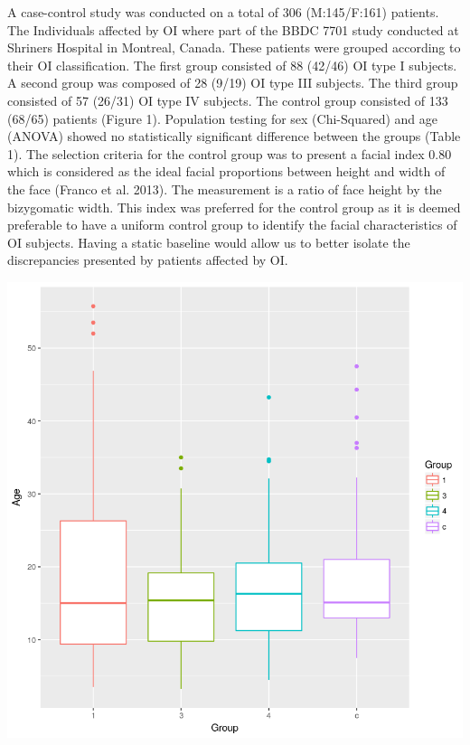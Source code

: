 \documentclass{article}
\begin{document}
\begin{multicols}{2}
A case-control study was conducted on a total of 306 (M:145/F:161)
patients. The Individuals affected by OI where part of the BBDC 7701
study conducted at Shriners Hospital in Montreal, Canada. These patients
were grouped according to their OI classification. The first group
consisted of 88 (42/46) OI type I subjects. A second group was composed
of 28 (9/19) OI type III subjects. The third group consisted of 57
(26/31) OI type IV subjects. The control group consisted of 133 (68/65)
patients (Figure 1). Population testing for sex (Chi-Squared) and age
(ANOVA) showed no statistically significant difference between the
groups (Table 1). The selection criteria for the control group was to
present a facial index 0.80 which is considered as the ideal facial
proportions between height and width of the face (Franco et al. 2013).
The measurement is a ratio of face height by the bizygomatic width. This
index was preferred for the control group as it is deemed preferable to
have a uniform control group to identify the facial characteristics of
OI subjects. Having a static baseline would allow us to better isolate
the discrepancies presented by patients affected by OI.


\begin{center}
\includegraphics[width=\linewidth]{figures/sample.png}
\end{center}


\end{multicols}
\end{document}
